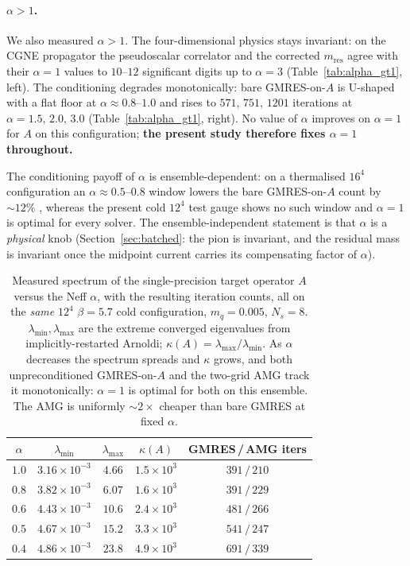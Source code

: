 \documentclass[12pt,a4paper]{article}
\newcommand{\Aop}{A}
\begin{document}
\paragraph{$\alpha>1$.} We also measured $\alpha>1$. The four-dimensional physics
stays invariant: on the CGNE propagator the pseudoscalar correlator and the
corrected $m_{\mathrm{res}}$ agree with their $\alpha=1$ values to $10$--$12$
significant digits up to $\alpha=3$ (Table~\ref{tab:alpha_gt1}, left). The
conditioning degrades monotonically: bare GMRES-on-$\Aop$ is U-shaped with a flat
floor at $\alpha\!\approx\!0.8$--$1.0$ and rises to $571,\,751,\,1201$ iterations at
$\alpha=1.5,\,2.0,\,3.0$ (Table~\ref{tab:alpha_gt1}, right). No value of $\alpha$
improves on $\alpha=1$ for $\Aop$ on this configuration; \textbf{the present study
therefore fixes $\alpha=1$ throughout.}

The conditioning payoff of $\alpha$ is ensemble-dependent: on a thermalised $16^4$
configuration an $\alpha\!\approx\!0.5\text{--}0.8$ window lowers the bare
GMRES-on-$\Aop$ count by ${\sim}12\%$ \cite{ChenAlpha}, whereas the present cold
$12^4$ test gauge shows no such window and $\alpha=1$ is optimal for every solver.
The ensemble-independent statement is that $\alpha$ is a \emph{physical} knob
(Section~\ref{sec:batched}: the pion is invariant, and the residual mass is
invariant once the midpoint current carries its compensating factor of $\alpha$).

\begin{table}[h]
\centering
\begin{tabular}{ccccc}
\toprule
$\alpha$ & $\lambda_{\min}$ & $\lambda_{\max}$ & $\kappa(\Aop)$ & GMRES\,/\,AMG iters \\
\midrule
$1.0$ & $3.16\times10^{-3}$ & $4.66$ & $1.5\times10^3$ & $391\,/\,210$ \\
$0.8$ & $3.82\times10^{-3}$ & $6.07$ & $1.6\times10^3$ & $391\,/\,229$ \\
$0.6$ & $4.43\times10^{-3}$ & $10.6$ & $2.4\times10^3$ & $481\,/\,266$ \\
$0.5$ & $4.67\times10^{-3}$ & $15.2$ & $3.3\times10^3$ & $541\,/\,247$ \\
$0.4$ & $4.86\times10^{-3}$ & $23.8$ & $4.9\times10^3$ & $691\,/\,339$ \\
\bottomrule
\end{tabular}
\caption{Measured spectrum of the single-precision target operator $\Aop$ versus
the Neff $\alpha$, with the resulting iteration counts, all on the \emph{same}
$12^4$ $\beta=5.7$ cold configuration, $m_q=0.005$, $N_s=8$.
$\lambda_{\min},\lambda_{\max}$ are the extreme converged eigenvalues from
implicitly-restarted Arnoldi; $\kappa(\Aop)=\lambda_{\max}/\lambda_{\min}$. As
$\alpha$ decreases the spectrum spreads and $\kappa$ grows, and both
unpreconditioned GMRES-on-$\Aop$ and the two-grid AMG track it monotonically:
$\alpha=1$ is optimal for both on this ensemble. The AMG is uniformly ${\sim}2\times$
cheaper than bare GMRES at fixed $\alpha$.}
\label{tab:spectrum}
\end{table}
\end{document}
